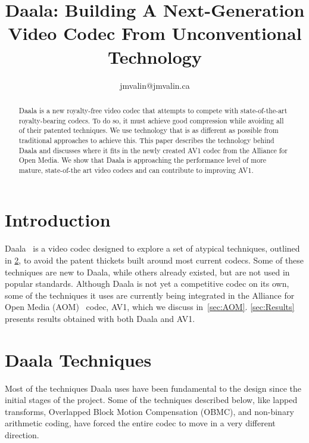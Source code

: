 \documentclass[english,conference,10pt]{IEEEtran}
\begin{document}
\title{Daala: Building A Next-Generation Video Codec From Unconventional
Technology}


\author{\vspace{1.18mm}
jmvalin@jmvalin.ca}
\maketitle
\begin{abstract}
Daala is a new royalty-free video codec that attempts to compete with
 state-of-the-art royalty-bearing codecs.
To do so, it must achieve good compression while avoiding all of their
 patented techniques.
We use technology that is as different as possible from traditional
 approaches to achieve this.
This paper describes the technology behind Daala and discusses where it fits in
 the newly created AV1 codec from the Alliance for Open Media.
We show that Daala is approaching the performance level of more mature,
 state-of-the art video codecs and can contribute to improving AV1.
\end{abstract}

\section{Introduction}

Daala~\cite{DaalaWebsite} is a video codec designed to explore a set of
 atypical techniques, outlined in \cref{sec:techniques}, to avoid the patent
 thickets built around most current codecs.
Some of these techniques are new to Daala, while others already existed, but
are not used in popular standards. Although Daala is not yet
a competitive codec on its own, some of the techniques it uses are
currently being integrated in the Alliance for Open Media 
(AOM)~\cite{AOMWebsite} codec, AV1, which we discuss in~\cref{sec:AOM}.
\cref{sec:Results} presents results obtained with both Daala and AV1.

\section{Daala Techniques}
\label{sec:techniques}

Most of the techniques Daala uses have been fundamental to the design since the
initial stages of the project. Some of the techniques described below, like
lapped transforms, Overlapped Block Motion Compensation (OBMC), and non-binary
arithmetic coding, have forced the entire codec to move in a very
different direction.
\end{document}
